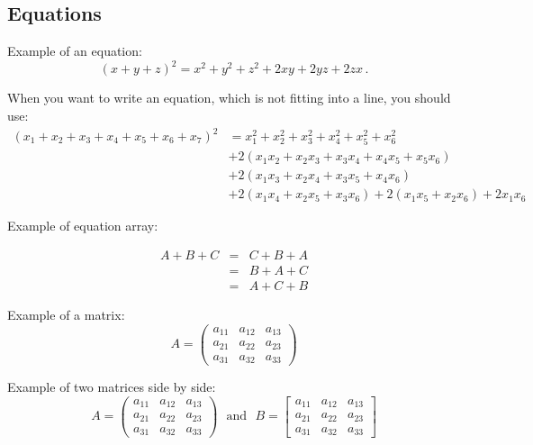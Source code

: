 \documentclass[11pt,leqno]{amsart}
\numberwithin{equation}{subsection}
\theoremstyle{definition}
\begin{document}
\subsection{Equations}
Example of an equation: 
\begin{equation}
(x+y+z)^2 = x^2+y^2+z^2+2xy+2yz+2zx\,. 
\end{equation}

\noindent
When you want to write an equation, which is not fitting into a line, you should use: 
\begin{align}
(x_1 + x_2 + x_3 + x_4 + x_5 + x_6 + x_7)^2 
& = x_1^2 + x_2^2 + x_3^2 + x_4^2 + x_5^2 + x_6^2 \nonumber \\ 
& + 2(x_1x_2 + x_2x_3 + x_3x_4 + x_4x_5 + x_5x_6) \nonumber \\ 
& + 2(x_1x_3 + x_2x_4 + x_3x_5 + x_4x_6)  \\ 
& + 2(x_1x_4 + x_2x_5 + x_3x_6) + 2(x_1x_5 + x_2x_6) + 2x_1x_6 \nonumber 
\end{align}

\noindent
Example of equation array: 

\begin{eqnarray}
A + B + C & = & C + B + A \nonumber \\ 
& = & B + A + C  \\ 
& = & A + C + B \nonumber
\end{eqnarray}

\noindent
Example of a matrix: 
\begin{equation}
A = \begin{pmatrix}
a_{11} & a_{12} & a_{13} \\ 
a_{21} & a_{22} & a_{23} \\ 
a_{31} & a_{32} & a_{33} 
\end{pmatrix} 
\end{equation}

\noindent
Example of two matrices side by side: 
\begin{equation}
A = \begin{pmatrix}
a_{11} & a_{12} & a_{13} \\ 
a_{21} & a_{22} & a_{23} \\ 
a_{31} & a_{32} & a_{33} 
\end{pmatrix} 
\ \ \ \text{and}\ \ \ 
B = \begin{bmatrix}
a_{11} & a_{12} & a_{13} \\ 
a_{21} & a_{22} & a_{23} \\ 
a_{31} & a_{32} & a_{33} 
\end{bmatrix}
\end{equation}
\end{document}

